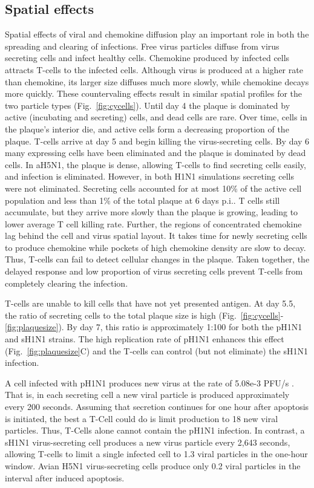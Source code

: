 \documentclass[10pt]{article}
\begin{document}
\subsection*{Spatial effects}

Spatial effects of viral and chemokine diffusion play an important role in both the spreading and clearing of infections.  Free virus particles diffuse from virus secreting cells and infect healthy cells.  Chemokine produced by infected cells attracts T-cells to the infected cells.  Although virus is produced at a higher rate than chemokine, its larger size diffuses much more slowly, while chemokine decays more quickly.  These countervaling effects result in similar spatial profiles for the two particle types (Fig.~\ref{fig:cycells}). Until day 4 the plaque is dominated by active (incubating and secreting) cells, and dead cells are rare. Over time, cells in the plaque's interior die, and active cells form a decreasing proportion of the plaque. T-cells arrive at day 5 and begin killing the virus-secreting cells. By day 6 many expressing cells have been eliminated and the plaque is dominated by dead cells.  In aH5N1, the plaque is dense, allowing T-cells to find secreting cells easily, and infection is eliminated.  However, in both H1N1 simulations secreting cells were not eliminated.  Secreting cells accounted for at most 10\% of the active cell population and less than 1\% of the total plaque at 6 days p.i..  T cells still accumulate, but they arrive more slowly than the plaque is growing, leading to lower average T cell killing rate.  Further, the regions of concentrated chemokine lag behind the cell and virus spatial layout.  It takes time for newly secreting cells to produce chemokine while pockets of high chemokine density are slow to decay.  Thus, T-cells can fail to detect cellular changes in the plaque.  Taken together, the delayed response and low proportion of virus secreting cells prevent T-cells from completely clearing the infection.

T-cells are unable to kill cells that have not yet presented antigen.  At day 5.5, the ratio of secreting cells to the total plaque size is high (Fig.~\ref{fig:cycells}-\ref{fig:plaquesize}). By day 7, this ratio is approximately 1:100 for both the pH1N1 and sH1N1 strains.  The high replication rate of pH1N1 enhances this effect (Fig.~\ref{fig:plaquesize}C) and the T-cells can control (but not eliminate) the sH1N1 infection.

A cell infected with pH1N1 produces new virus at the rate of 5.08e-3 PFU/s \cite{Mitchell2011}.  That is, in each secreting cell a new viral particle is produced approximately every 200 seconds.  Assuming that secretion continues for one hour after apoptosis is initiated, the best a T-Cell could do is limit production to 18 new viral particles.  Thus, T-Cells alone cannot contain the pH1N1 infection.  In contrast, a sH1N1 virus-secreting cell produces a new virus particle every 2,643 seconds, allowing T-cells to limit a single infected cell to 1.3 viral particles in the one-hour window.  Avian H5N1 virus-secreting cells produce only 0.2 viral particles in the interval after induced apoptosis. 
\end{document}
